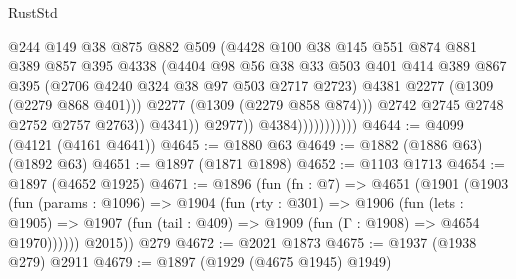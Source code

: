 \begin{lexlean}{RustStd}
\begin{coremodule}
                                      @244
                                      @149
                                      @38
                                      @875
                                      @882
                                      @509
                                      (@4428
                                        @100
                                        @38
                                        @145
                                        @551
                                        @874
                                        @881
                                        @389
                                        @857
                                        @395
                                        @4338
                                        (@4404
                                          @98
                                          @56
                                          @38
                                          @33
                                          @503
                                          @401
                                          @414
                                          @389
                                          @867
                                          @395
                                          (@2706 @4240 @324 @38 @97 @503 @2717 @2723)
                                          @4381
                                          @2277
                                          (@1309 (@2279 @868 @401)))
                                        @2277
                                        (@1309 (@2279 @858 @874)))
                                      @2742
                                      @2745
                                      @2748
                                      @2752
                                      @2757
                                      @2763))
                                  @4341))
                              @2977))
                          @4384)))))))))))
@4644 := @4099 (@4121 (@4161 @4641))
@4645 := @1880 @63
@4649 := @1882 (@1886 @63) (@1892 @63)
@4651 := @1897 (@1871 @1898)
@4652 := @1103 @1713
@4654 := @1897 (@4652 @1925)
@4671 := @1896
    (fun (fn : @7) =>
    @4651
      (@1901
        (@1903
          (fun (params : @1096) =>
          @1904
            (fun (rty : @301) =>
            @1906
              (fun (lets : @1905) =>
              @1907 (fun (tail : @409) => @1909 (fun (Γ : @1908) => @4654 @1970))))))
        @2015))
    @279
@4672 := @2021 @1873
@4675 := @1937 (@1938 @279) @2911
@4679 := @1897 (@1929 (@4675 @1945) @1949)

\end{coremodule}
\end{lexlean}
